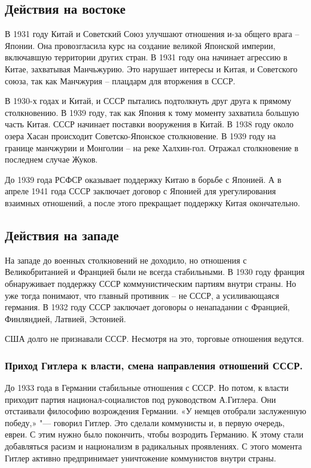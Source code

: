 \subsection{Действия на востоке}

В 1931 году Китай и Советский Союз улучшают отношения и-за общего врага – Японии. Она провозгласила курс на создание великой Японской империи, включавшую территории других стран. В 1931 году она начинает агрессию в Китае, захватывая Манчьжурию. Это нарушает интересы и Китая, и Советского союза, так как Манчжурия – плацдарм для вторжения в СССР. 

В 1930-х годах и Китай, и СССР пытались подтолкнуть друг друга к прямому столкновению. В 1939 году, так как Япония к тому моменту захватила большую часть Китая. СССР начинает поставки вооружения в Китай. В 1938 году около озера Хасан происходит Советско-Японское столкновение. В 1939 году на границе манчжурии и Монголии – на реке Халхин-гол. Отражал столкновение в последнем случае Жуков.

До 1939 года РСФСР оказывает поддержку Китаю в борьбе с Японией. А в апреле 1941 года СССР заключает договор с Японией для урегулирования взаимных отношений, а после этого прекращает поддержку Китая окончательно.

\subsection{Действия на западе}

На западе до военных столкновений не доходило, но отношения с Великобританией и Францией были не всегда стабильными. В 1930 году франция обнаруживает поддержку СССР коммунистическим партиям внутри страны. Но уже тогда понимают, что главный противник – не СССР, а усиливающаяся германия. В 1932 году СССР заключает договоры о ненападании с Францией, Финляндией, Латвией, Эстонией.

США долго не признавали СССР. Несмотря на это, торговые отношения ведутся.

\subsubsection{\textbf{Приход Гитлера к власти, смена направления отношений СССР.}}

До 1933 года в Германии стабильные отношения с СССР. Но потом, к власти приходит партия национал-социалистов под руководством А.Гитлера. Они отстаивали философию возрождения Германии. «У немцев отобрали заслуженную победу,» "--- говорил Гитлер. Это сделали коммунисты и, в первую очередь, евреи. С этим нужно было покончить, чтобы возродить Германию. К этому стали добавляться расизм и национализм в радикальных проявлениях. С этого момента Гитлер активно предпринимает уничтожение коммунистов внутри страны. 

